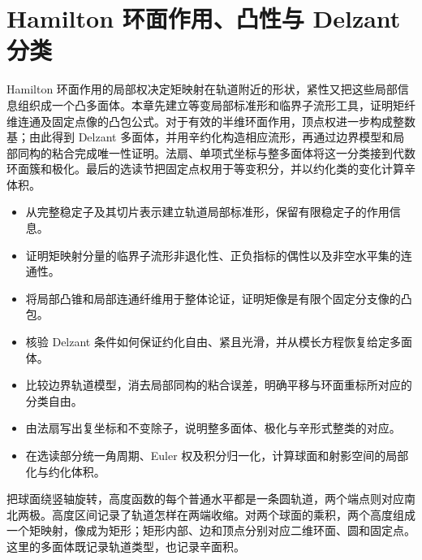 
% 
% 

\chapter{Hamilton 环面作用、凸性与 Delzant 分类}
\label{g4:ch:12}

\begin{chapterabstract}
Hamilton 环面作用的局部权决定矩映射在轨道附近的形状，紧性又把这些局部信息组织成一个凸多面体。本章先建立等变局部标准形和临界子流形工具，证明矩纤维连通及固定点像的凸包公式。对于有效的半维环面作用，顶点权进一步构成整数基；由此得到 Delzant 多面体，并用辛约化构造相应流形，再通过边界模型和局部同构的粘合完成唯一性证明。法扇、单项式坐标与整多面体将这一分类接到代数环面簇和极化。最后的选读节把固定点权用于等变积分，并以约化类的变化计算辛体积。
\end{chapterabstract}

\begin{learninggoals}
\begin{itemize}
	\item 从完整稳定子及其切片表示建立轨道局部标准形，保留有限稳定子的作用信息。
	\item 证明矩映射分量的临界子流形非退化性、正负指标的偶性以及非空水平集的连通性。
	\item 将局部凸锥和局部连通纤维用于整体论证，证明矩像是有限个固定分支像的凸包。
	\item 核验 Delzant 条件如何保证约化自由、紧且光滑，并从模长方程恢复给定多面体。
	\item 比较边界轨道模型，消去局部同构的粘合误差，明确平移与环面重标所对应的分类自由。
	\item 由法扇写出复坐标和不变除子，说明整多面体、极化与辛形式整类的对应。
	\item 在选读部分统一角周期、Euler 权及积分归一化，计算球面和射影空间的局部化与约化体积。
\end{itemize}
\end{learninggoals}

把球面绕竖轴旋转，高度函数的每个普通水平都是一条圆轨道，两个端点则对应南北两极。高度区间记录了轨道怎样在两端收缩。对两个球面的乘积，两个高度组成一个矩映射，像成为矩形；矩形内部、边和顶点分别对应二维环面、圆和固定点。这里的多面体既记录轨道类型，也记录辛面积。


